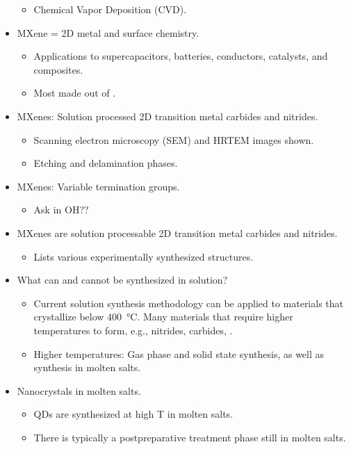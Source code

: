 \documentclass[../notes.tex]{subfiles}
\begin{document}
\begin{itemize}
\begin{itemize}
        \item Chemical Vapor Deposition (CVD).
    \end{itemize}
    \item MXene = 2D metal and surface chemistry.
    \begin{itemize}
        \item Applications to supercapacitors, batteries, conductors, catalysts, and composites.
        \item Most made out of .
    \end{itemize}
    \item MXenes: Solution processed 2D transition metal carbides and nitrides.
    \begin{itemize}
        \item Scanning electron microscopy (SEM) and HRTEM images shown.
        \item Etching and delamination phases.
    \end{itemize}
    \item MXenes: Variable termination groups.
    \begin{itemize}
        \item Ask in OH??
    \end{itemize}
    \item MXenes are solution processable 2D transition metal carbides and nitrides.
    \begin{itemize}
        \item Lists various experimentally synthesized structures.
    \end{itemize}
    \item What can and cannot be synthesized in solution?
    \begin{itemize}
        \item Current solution synthesis methodology can be applied to materials that crystallize below \SI{400}{\celsius}. Many materials that require higher temperatures to form, e.g., nitrides, carbides, .
        \item Higher temperatures: Gas phase and solid state synthesis, as well as synthesis in molten salts.
    \end{itemize}
    \item Nanocrystals in molten salts.
    \begin{itemize}
        \item QDs are synthesized at high T in molten salts.
        \item There is typically a postpreparative treatment phase still in molten salts.

\end{itemize}
\end{itemize}
\end{document}
